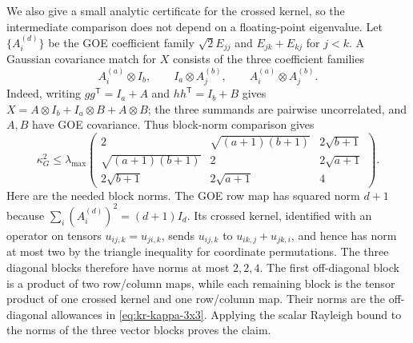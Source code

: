 \documentclass[11pt,a4paper]{article}
\theoremstyle{definition}\newtheorem{definition}[theorem]{Definition}
\theoremstyle{remark}\newtheorem{remark}[theorem]{Remark}
\numberwithin{equation}{section}
\begin{document}
We also give a small analytic certificate for the crossed kernel, so the
intermediate comparison does not depend on a floating-point eigenvalue.
Let $\{A_i^{(d)}\}$ be the GOE coefficient family
$\sqrt2 E_{jj}$ and $E_{jk}+E_{kj}$ for $j<k$. A Gaussian covariance match
for $X$ consists of the three coefficient families
\[
 A_i^{(a)}\otimes I_b,\qquad
 I_a\otimes A_j^{(b)},\qquad
 A_i^{(a)}\otimes A_j^{(b)}.
\]
Indeed, writing $gg^{\mathsf T}=I_a+A$ and $hh^{\mathsf T}=I_b+B$ gives
$X=A\otimes I_b+I_a\otimes B+A\otimes B$; the three summands are pairwise
uncorrelated, and $A,B$ have GOE covariance. Thus block-norm comparison gives
\begin{equation}\label{eq:kr-kappa-3x3}
 \kappa_G^2\le\lambda_{\max}
 \begin{pmatrix}
  2&\sqrt{(a+1)(b+1)}&2\sqrt{b+1}\\
  \sqrt{(a+1)(b+1)}&2&2\sqrt{a+1}\\
  2\sqrt{b+1}&2\sqrt{a+1}&4
 \end{pmatrix}.
\end{equation}
Here are the needed block norms. The GOE row map has squared norm $d+1$
because $\sum_i(A_i^{(d)})^2=(d+1)I_d$. Its crossed kernel, identified with
an operator on tensors $u_{ij,k}=u_{ji,k}$, sends
$u_{ij,k}$ to $u_{ik,j}+u_{jk,i}$, and hence has norm at most two by the
triangle inequality for coordinate permutations. The three diagonal blocks
therefore have norms at most $2,2,4$. The first off-diagonal block is a
product of two row/column maps, while each remaining block is the tensor
product of one crossed kernel and one row/column map. Their norms are the
off-diagonal allowances in \eqref{eq:kr-kappa-3x3}. Applying the scalar
Rayleigh bound to the norms of the three vector blocks proves the claim.
\end{document}
